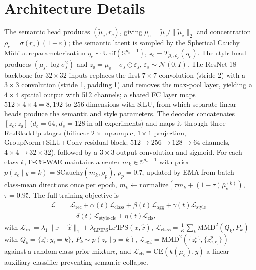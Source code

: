 \documentclass[10pt,letterpaper]{article}
\newcommand{\ours}{F-CS-WAE}
\newcommand{\zc}{z_{\mathrm{c}}}
\newcommand{\zs}{z_{\mathrm{s}}}
\newcommand{\muc}{\mu_{\mathrm{c}}}
\newcommand{\mus}{\mu_{\mathrm{s}}}
\newcommand{\Sph}{\mathbb{S}}
\newcommand{\MMD}{\mathrm{MMD}}
\newcommand{\CE}{\mathrm{CE}}
\newcommand{\SCauchy}{\mathrm{SCauchy}}
\begin{document}



\appendix

\section{Architecture Details}
\label{app:arch}

The semantic head produces $(\tilde\muc,r_c)$, giving
$\muc=\tilde\muc/\|\tilde\muc\|_2$ and concentration
$\rho_c=\sigma(r_c)(1-\varepsilon)$; the semantic latent is sampled by the
Spherical Cauchy M\"obius reparameterization $\eta_c\sim\mathrm{Unif}(\Sph^{d_c-1})$,
$\zc=T_{\muc,\rho_c}(\eta_c)$. The style head produces $(\mus,\log\sigma_s^2)$
and $\zs=\mus+\sigma_s\odot\varepsilon_s$, $\varepsilon_s\sim\mathcal N(0,I)$.
The ResNet-18 backbone for $32\times32$ inputs replaces the first
$7\times7$ convolution (stride 2) with a $3\times3$ convolution (stride 1,
padding 1) and removes the max-pool layer, yielding a $4\times4$ spatial
output with 512 channels; a shared FC layer maps
$512\times4\times4{=}8{,}192$ to 256 dimensions with SiLU, from which
separate linear heads produce the semantic and style parameters. The
decoder concatenates $[\zc;\zs]$ ($d_c{=}64$, $d_s{=}128$ in all
experiments) and maps it through three ResBlockUp stages (bilinear
$2\times$ upsample, $1\times1$ projection, GroupNorm+SiLU+Conv residual
block; $512{\to}256{\to}128{\to}64$ channels, $4\times4\to32\times32$),
followed by a $3\times3$ output convolution and sigmoid. For each class
$k$, \ours{} maintains a center $m_k\in\Sph^{d_c-1}$ with prior
$p(\zc\mid y{=}k)=\SCauchy(m_k,\rho_p)$, $\rho_p{=}0.7$, updated by EMA from
batch class-mean directions once per epoch,
$m_k\leftarrow\mathrm{normalize}(\tau m_k+(1-\tau)\bar\muc^{(k)})$,
$\tau{=}0.95$. The full training objective is
\begin{align}
  \mathcal{L} &= \mathcal{L}_{\mathrm{rec}} + \alpha(t)\mathcal{L}_{\mathrm{class}}
   + \beta(t)\mathcal{L}_{\mathrm{agg}} + \gamma(t)\mathcal{L}_{\mathrm{style}} \nonumber\\
  &\quad + \delta(t)\mathcal{L}_{\mathrm{style\text{-}cls}} + \eta(t)\mathcal{L}_{\mathrm{cls}},
\end{align}
with $\mathcal{L}_{\mathrm{rec}}=\lambda_1\|x-\hat x\|_1+\lambda_{\mathrm{LPIPS}}\mathrm{LPIPS}(x,\hat x)$,
$\mathcal{L}_{\mathrm{class}}=\frac1K\sum_k\MMD^2(Q_k,P_k)$ with
$Q_k=\{\zc^i{:}y_i{=}k\}$, $P_k\sim p(\zc\mid y{=}k)$,
$\mathcal{L}_{\mathrm{agg}}=\MMD^2(\{\zc^i\},\{z_{c,r_j}^p\})$ against a
random-class prior mixture, and $\mathcal{L}_{\mathrm{cls}}=\CE(h(\muc),y)$
a linear auxiliary classifier preventing semantic collapse.
\end{document}
